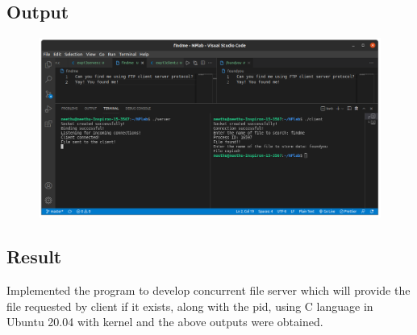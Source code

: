 \subsection{Output}
\begin{figure}[h]
            \centering
            \includegraphics[scale=0.4]{img/exp12.png}
\end{figure}

\subsection{Result}
Implemented the program to develop concurrent file server which will provide the file requested by client if it exists, along with the pid, using C language in Ubuntu 20.04 with kernel and the above outputs were obtained.

